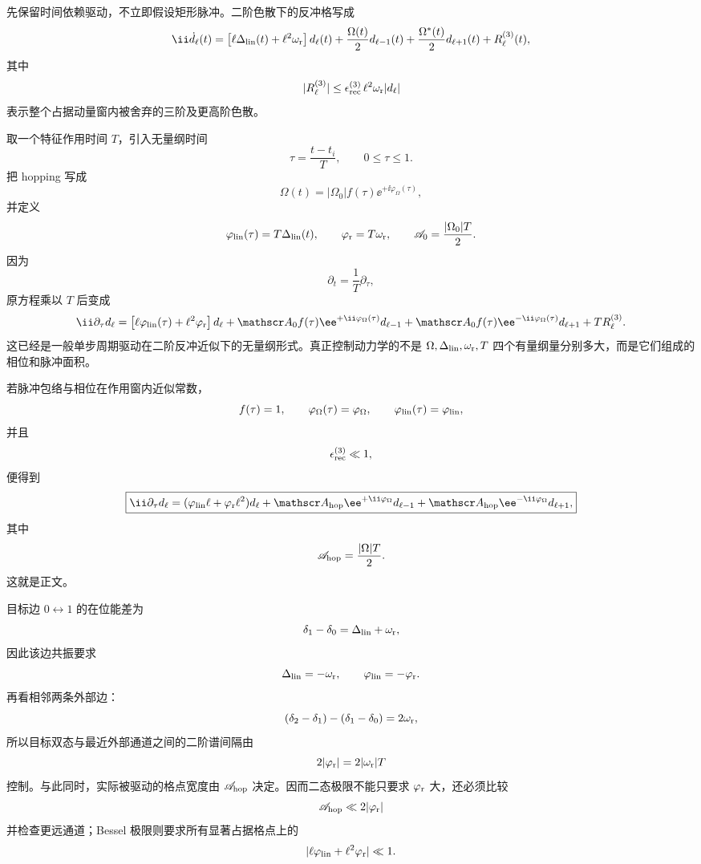 













\begin{derivation}[反冲能量格的无量纲方程]

先保留时间依赖驱动，不立即假设矩形脉冲。二阶色散下的反冲格写成
\[
\ii\dot d_\ell(t)
=
\left[
\ell\Delta_{\rm lin}(t)
+\ell^2\omega_{\rm r}
\right]d_\ell(t)
+
\frac{\Omega(t)}2d_{\ell-1}(t)
+
\frac{\Omega^*(t)}2d_{\ell+1}(t)
+
R_\ell^{(3)}(t),
\]
其中
\[
|R_\ell^{(3)}|
\le
\epsilon_{\rm rec}^{(3)}
\,\ell^2\omega_{\rm r}|d_\ell|
\]
表示整个占据动量窗内被舍弃的三阶及更高阶色散。

取一个特征作用时间 $T$，引入无量纲时间
\[
\tau=\frac{t-t_i}{T},
\qquad
0\le\tau\le1.
\]
把 hopping 写成
\[
\Omega(t)
=
|\Omega_0|f(\tau)
\ee^{+\ii\varphi_\Omega(\tau)},
\]
并定义
\[
\varphi_{\rm lin}(\tau)
=
T\Delta_{\rm lin}(t),
\qquad
\varphi_{\rm r}
=
T\omega_{\rm r},
\qquad
\mathscr A_0
=
\frac{|\Omega_0|T}{2}.
\]
因为
\[
\partial_t
=
\frac1T\partial_\tau,
\]
原方程乘以 $T$ 后变成
\[
\ii\partial_\tau d_\ell
=
\left[
\ell\varphi_{\rm lin}(\tau)
+\ell^2\varphi_{\rm r}
\right]d_\ell
+
\mathscr A_0 f(\tau)\ee^{+\ii\varphi_\Omega(\tau)}d_{\ell-1}
+
\mathscr A_0 f(\tau)\ee^{-\ii\varphi_\Omega(\tau)}d_{\ell+1}
+
T R_\ell^{(3)}.
\]
这已经是一般单步周期驱动在二阶反冲近似下的无量纲形式。真正控制动力学的不是 $\Omega,\Delta_{\rm lin},\omega_{\rm r},T$ 四个有量纲量分别多大，而是它们组成的相位和脉冲面积。

若脉冲包络与相位在作用窗内近似常数，
\[
f(\tau)=1,
\qquad
\varphi_\Omega(\tau)=\varphi_\Omega,
\qquad
\varphi_{\rm lin}(\tau)=\varphi_{\rm lin},
\]
并且
\[
\epsilon_{\rm rec}^{(3)}
\ll1,
\]
便得到
\[
\boxed{
\ii\partial_\tau d_\ell
=
(\varphi_{\rm lin}\ell+\varphi_{\rm r}\ell^2)d_\ell
+\mathscr A_{\rm hop}\ee^{+\ii\varphi_\Omega}d_{\ell-1}
+\mathscr A_{\rm hop}\ee^{-\ii\varphi_\Omega}d_{\ell+1},
}
\]
其中
\[
\mathscr A_{\rm hop}
=
\frac{|\Omega|T}{2}.
\]
这就是正文。

目标边 $0\leftrightarrow1$ 的在位能差为
\[
\delta_1-\delta_0
=
\Delta_{\rm lin}+\omega_{\rm r},
\]
因此该边共振要求
\[
\Delta_{\rm lin}
=
-\omega_{\rm r},
\qquad
\varphi_{\rm lin}
=
-\varphi_{\rm r}.
\]
再看相邻两条外部边：
\[
(\delta_2-\delta_1)-(\delta_1-\delta_0)
=
2\omega_{\rm r},
\]
所以目标双态与最近外部通道之间的二阶谱间隔由
\[
2|\varphi_{\rm r}|
=
2|\omega_{\rm r}|T
\]
控制。与此同时，实际被驱动的格点宽度由 $\mathscr A_{\rm hop}$ 决定。因而二态极限不能只要求 $\varphi_{\rm r}$ 大，还必须比较
\[
\mathscr A_{\rm hop}
\ll
2|\varphi_{\rm r}|
\]
并检查更远通道；Bessel 极限则要求所有显著占据格点上的
\[
|\ell\varphi_{\rm lin}+\ell^2\varphi_{\rm r}|
\ll1.
\]
\end{derivation}






